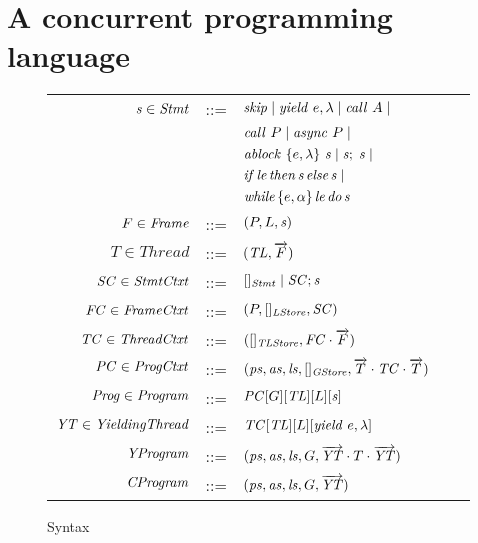 \section{A concurrent programming language}
\label{sec:language}

\begin{wrapfigure}{l}{0.6\textwidth}
\setlength{\tabcolsep}{3pt}
\scriptsize{
\begin{tabular}{rclcl}
$\mathit{s} \in \mathit{Stmt}$ &::= & $\mathit{skip} \mid \mathit{yield}\ e,\lambda \mid \mathit{call}\ A \mid$ \\
                  & & $\mathit{call}\ P \mid \mathit{async}\ P \mid$ \\
                  & & $\mathit{ablock}\ {\{e,\lambda\}}\ {\mathit{s}} \mid \mathit{s};\;\mathit{s} \mid$\\
                  & & $\mathit{if}\hspace{0.5mm}{\mathit{le}}\hspace{0.5mm}\mathit{then}\hspace{0.5mm}{\mathit{s}}\hspace{0.5mm}\mathit{else}\hspace{0.5mm}{\mathit{s}} \mid$ \\
                  & & $\mathit{while}\hspace{0.5mm}\{e,\alpha\}\hspace{0.5mm}{\mathit{le}}\hspace{0.5mm}\mathit{do}\hspace{0.5mm}{\mathit{s}}$ \\
$F \in \mathit{Frame}$ &::= & $(P, L, \mathit{s})$ \\
$T \in \mathit{Thread}$ &::= &$(\mathit{TL}, \overrightarrow{F})$ \\
$\mathit{SC} \in \mathit{StmtCtxt}$ &::= &$[]_{\mathit{Stmt}} \mid \mathit{SC};\mathit{s}$ \\
$\mathit{FC} \in \mathit{FrameCtxt}$ &::= & $(P, []_{\mathit{LStore}}, \mathit{SC})$ \\
$\mathit{TC} \in \mathit{ThreadCtxt}$ &::= &$([]_{\mathit{TLStore}}, \mathit{FC}\cdot\overrightarrow{F})$ \\
$\mathit{PC} \in \mathit{ProgCtxt}$ &::= & $(\mathit{ps}, \mathit{as}, \mathit{ls}, []_{\mathit{GStore}}, \overrightarrow{T} \cdot \mathit{TC} \cdot \overrightarrow{T})$ \\
$\mathit{Prog} \in \mathit{Program}$ &::= & $\mathit{PC}[G][\mathit{TL}][L][\mathit{s}]$ \\
$\mathit{YT} \in \mathit{YieldingThread}$ &::= &$\mathit{TC}[\mathit{TL}][L][\mathit{yield}\ e,\lambda]$ \\
$\mathit{YProgram}$ &::= & $(\mathit{ps}, \mathit{as}, \mathit{ls}, G, \overrightarrow{\mathit{YT}} \cdot T \cdot \overrightarrow{\mathit{YT}})$ \\
$\mathit{CProgram}$ &::= & $(\mathit{ps}, \mathit{as}, \mathit{ls}, G, \overrightarrow{\mathit{YT}})$
\end{tabular}
}
\caption{Syntax}
\label{fig:syntax}
\end{wrapfigure}

